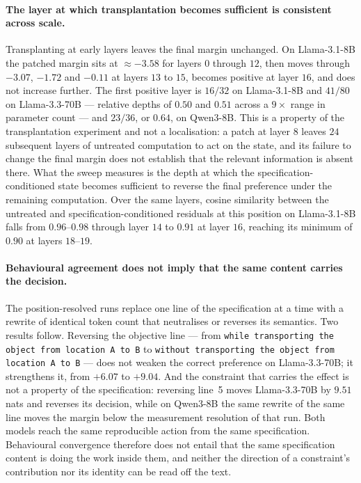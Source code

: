 \paragraph{The layer at which transplantation becomes sufficient is consistent across scale.}
Transplanting at early layers leaves the final margin unchanged. On Llama-3.1-8B the
patched margin sits at $\approx-3.58$ for layers $0$ through $12$, then moves through
$-3.07$, $-1.72$ and $-0.11$ at layers $13$ to $15$, becomes positive at layer $16$,
and does not increase further. The first positive layer is $16/32$ on Llama-3.1-8B
and $41/80$ on Llama-3.3-70B --- relative depths of $0.50$ and $0.51$ across a
$9\times$ range in parameter count --- and $23/36$, or $0.64$, on Qwen3-8B. This is a
property of the transplantation experiment and not a localisation: a patch at layer
$8$ leaves $24$ subsequent layers of untreated computation to act on the state, and
its failure to change the final margin does not establish that the relevant
information is absent there. What the sweep measures is the depth at which the
specification-conditioned state becomes sufficient to reverse the final preference
under the remaining computation. Over the same layers, cosine similarity between the
untreated and specification-conditioned residuals at this position on Llama-3.1-8B
falls from $0.96$--$0.98$ through layer $14$ to $0.91$ at layer $16$, reaching its
minimum of $0.90$ at layers $18$--$19$.

\paragraph{Behavioural agreement does not imply that the same content carries the decision.}
The position-resolved runs replace one line of the specification at a time with a
rewrite of identical token count that neutralises or reverses its semantics. Two
results follow. Reversing the objective line --- from \texttt{while transporting the
object from location A to B} to \texttt{without transporting the object from location
A to B} --- does not weaken the correct preference on Llama-3.3-70B; it strengthens
it, from $+6.07$ to $+9.04$. And the constraint that carries the effect is not a
property of the specification: reversing line~5 moves Llama-3.3-70B by $9.51$ nats
and reverses its decision, while on Qwen3-8B the same rewrite of the same line moves
the margin below the measurement resolution of that run. Both models reach the same
reproducible action from the same specification. Behavioural convergence therefore
does not entail that the same specification content is doing the work inside them,
and neither the direction of a constraint's contribution nor its identity can be read
off the text.

